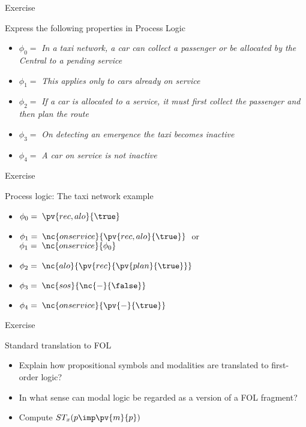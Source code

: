 \documentclass{beamer}
\begin{document}
\begin{slide}{\red Exercise}\label{s:26}
\small
\begin{exampleblock}{Express the following properties in Process Logic}
\begin{itemize}
\item $\phi_0 =$ \emph{In a taxi network, a car can collect a passenger or be allocated by the Central to a pending service}
\item $\phi_1 =$ \emph{This applies only to cars already on service}
\item $\phi_2 =$
 \emph{If a car is allocated to a service, it must first collect the passenger and then plan the route}
\item $\phi_3 =$ \emph{On detecting an emergence the taxi becomes inactive}
\item $\phi_4 =$ \emph{A car on service is not inactive}
\end{itemize}
\end{exampleblock}
\end{slide}

\begin{slide}{\red Exercise}\label{s:27}
\small
\begin{exampleblock}{Process logic: The taxi network example}
\begin{itemize}
\item $\phi_0 =\; \pv{rec,alo}{\true}$ 
\item $\phi_1 =\;  \nc{onservice}{\pv{rec,alo}{\true}}\; $ or\\
$\phi_1 =\;   \nc{onservice}{\phi_0}$
\item $\phi_2 =\;  \nc{alo}{\pv{rec}{\pv{plan}{\true}}}$
\item $\phi_3 =\;  \nc{sos}{\nc{-}{\false}}$
\item $\phi_4 =\;  \nc{onservice}{\pv{-}{\true}}$
\end{itemize}
\end{exampleblock}
\end{slide}


\begin{slide}{\red Exercise}\label{s:28}
\small
\begin{exampleblock}{Standard translation to FOL}
\begin{itemize}
\item Explain how propositional symbols and modalities are translated to first-order logic?
\item In what sense can modal logic be regarded as a  version of a FOL fragment?
\item Compute  $ST_x (p \imp \pv{m}{p})$ 
\end{itemize}
\end{exampleblock}
\end{slide}
\end{document}
